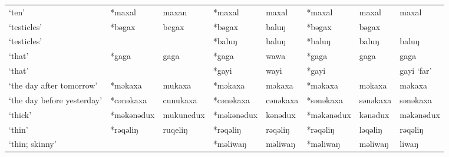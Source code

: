 \begin{landscape}
\begin{longtable}[c]{@{}p{3cm}<{\raggedright}p{2.75cm}<{\raggedright}p{2.75cm}<{\raggedright}p{2.75cm}<{\raggedright}p{2.75cm}<{\raggedright}p{2.75cm}<{\raggedright}p{2.75cm}<{\raggedright}p{2.75cm}<{\raggedright}@{}}
`ten'                                                & *maxal             & maxan                          & *maxal             & maxal                      & *maxal           & maxal                    & maxal                             \\
`testicles'                                          & *bəgax             & begax                          & *bəgax             & baluŋ                      & *bəgax           & bəgax                    &                                   \\
`testicles'                                          &                    &                                & *baluŋ             & baluŋ                      & *baluŋ           & baluŋ                    & baluŋ                             \\
`that'                                               & *gaga              & gaga                           & *gaga              & wawa                       & *gaga            & gaga                     & gaga                              \\
`that'                                               &                    &                                & *gayi              & wayi                        & *gayi            &                          & gayi `far'                        \\
`the day after tomorrow'                             & *məkaxa            & mukaxa                         & *məkaxa            & məkaxa                     & *məkaxa          & məkaxa                   & məkaxa                            \\
`the day before yesterday'                           & *cənəkaxa          & cunukaxa                       & *cənəkaxa          & cənəkaxa                   & *sənəkaxa        & sənəkaxa                 & sənəkaxa                          \\
`thick'                                              & *məkənədux         & mukunedux                      & *məkənədux         & kənədux                    & *məkənədux       & kənədux                  & məkənədux                         \\
`thin'                                               & *rəqəliŋ           & ruqeliŋ                        & *rəqəliŋ           & rəqəliŋ                    & *rəqəliŋ         & ləqəliŋ                  & rəqəliŋ                           \\
`thin; skinny'                                       &                    &                                & *məliwaŋ           & məliwaŋ                    & *məliwaŋ         & məliwaŋ                  & liwaŋ                             \\

\end{longtable}
\end{landscape}

